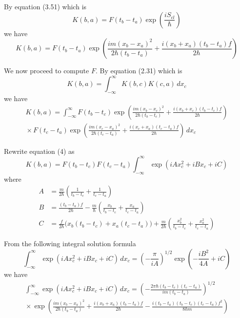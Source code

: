 \documentclass[12pt]{article}
\begin{document}
By equation (3.51) which is
\begin{equation*}
K(b,a)=F(t_b-t_a)\exp\left(\frac{iS_{cl}}{\hbar}\right)
\end{equation*}
we have
\begin{equation*}
K(b,a)=F(t_b-t_a)\exp\left(\frac{im(x_b-x_a)^2}{2\hbar(t_b-t_a)}+\frac{i(x_b+x_a)(t_b-t_a)f}{2\hbar}\right)
\tag{3}
\end{equation*}


We now proceed to compute $F$. By equation (2.31) which is
\begin{equation*}
K(b,a)=\int_{-\infty}^\infty K(b,c)K(c,a)\,dx_c
\end{equation*}
we have
\begin{multline*}
K(b,a)=\int_{-\infty}^\infty
F(t_b-t_c)\exp\left(\frac{im(x_b-x_c)^2}{2\hbar(t_b-t_c)}+\frac{i(x_b+x_c)(t_b-t_c)f}{2\hbar}\right)
\\
{}\times F(t_c-t_a)\exp\left(\frac{im(x_c-x_a)^2}{2\hbar(t_c-t_a)}+\frac{i(x_c+x_a)(t_c-t_a)f}{2\hbar}\right)
\,dx_c
\tag{4}
\end{multline*}


Rewrite equation (4) as
\begin{equation*}
K(b,a)=F(t_b-t_c)F(t_c-t_a)\int_{-\infty}^\infty
\exp(iAx_c^2+iBx_c+iC)
\tag{5}
\end{equation*}
where
\begin{align*}
A&=\frac{m}{2\hbar}\left(\frac{1}{t_b-t_c}+\frac{1}{t_c-t_a}\right)
\tag{6}
\\
B&=\frac{(t_b-t_a)f}{2\hbar}-\frac{m}{\hbar}\left(\frac{x_b}{t_b-t_c}+\frac{x_a}{t_c-t_a}\right)
\tag{7}
\\
C&=\frac{f}{2\hbar}\big(x_b(t_b-t_c)+x_a(t_c-t_a)\big)+\frac{m}{2\hbar}
\left(\frac{x_b^2}{t_b-t_c}+\frac{x_a^2}{t_c-t_a}\right)
\tag{8}
\end{align*}


From the following integral solution formula
\begin{equation*}
\int_{-\infty}^{\infty}\exp(iAx_c^2+iBx_c+iC)\,dx_c
=\left(-\frac{\pi}{iA}\right)^{1/2}
\exp\left(-\frac{iB^2}{4A}+iC\right)
\end{equation*}
we have
{\footnotesize
\begin{multline*}
\int_{-\infty}^{\infty}\exp(iAx_c^2+iBx_c+iC)\,dx_c
=\left(-\frac{2\pi\hbar(t_b-t_c)(t_c-t_a)}{im(t_b-t_a)}\right)^{1/2}
\\
{}\times\exp\left(
\frac{im(x_b-x_a)^2}{2\hbar(t_b-t_a)}
+\frac{i(x_b+x_a)(t_b-t_a)f}{2\hbar}
-\frac{i(t_b-t_a)(t_b-t_c)(t_c-t_a)f^2}{8\hbar m}
\right)
\tag{9}
\end{multline*}
}
\end{document}
